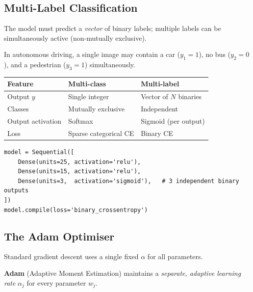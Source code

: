 \subsection{Multi-Label Classification}

\begin{definition}
The model must predict a \emph{vector} of binary labels; multiple labels can
be simultaneously active (non-mutually exclusive).
\end{definition}

\begin{example}
In autonomous driving, a single image may contain a car ($y_1=1$), no bus
($y_2=0$), and a pedestrian ($y_3=1$) simultaneously.
\end{example}

\begin{center}
\begin{tabular}{lll}
\toprule
\textbf{Feature} & \textbf{Multi-class} & \textbf{Multi-label}\\
\midrule
Output $y$           & Single integer   & Vector of $N$ binaries\\
Classes              & Mutually exclusive & Independent\\
Output activation    & Softmax          & Sigmoid (per output)\\
Loss                 & Sparse categorical CE & Binary CE\\
\bottomrule
\end{tabular}
\end{center}

\begin{lstlisting}[caption={Multi-label classification model}]
model = Sequential([
    Dense(units=25, activation='relu'),
    Dense(units=15, activation='relu'),
    Dense(units=3,  activation='sigmoid'),   # 3 independent binary outputs
])
model.compile(loss='binary_crossentropy')
\end{lstlisting}

\subsection{The Adam Optimiser}

Standard gradient descent uses a single fixed $\alpha$ for all parameters.

\begin{definition}[Adam]
\textbf{Adam} (Adaptive Moment Estimation) maintains a \emph{separate,
adaptive learning rate} $\alpha_j$ for every parameter $w_j$.
\end{definition}

